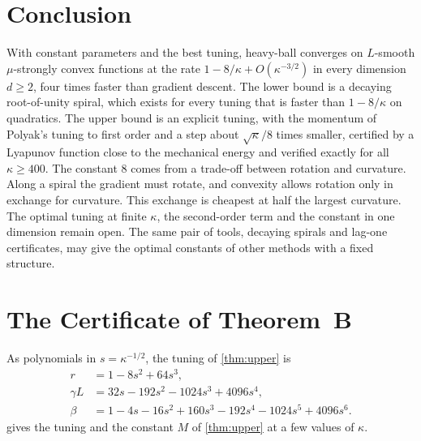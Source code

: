 \documentclass[11pt, a4paper]{article}
\theoremstyle{definition}
\begin{document}
\section{Conclusion}
\label{sec:conclusion}

With constant parameters and the best tuning, heavy-ball converges on $L$-smooth $\mu$-strongly convex functions at the
rate $1-8/\kappa+O(\kappa^{-3/2})$ in every dimension $d\ge2$, four times faster than gradient descent. The lower bound
is a decaying root-of-unity spiral, which exists for every tuning that is faster than $1-8/\kappa$ on quadratics. The
upper bound is an explicit tuning, with the momentum of Polyak's tuning to first order and a step about
$\sqrt\kappa/8$ times smaller, certified by a
Lyapunov function close to the mechanical energy and verified exactly for all $\kappa\ge400$. The constant $8$ comes
from a trade-off between rotation and curvature. Along a spiral the gradient must rotate, and convexity allows rotation
only in exchange for curvature. This exchange is cheapest at half the largest curvature. The optimal tuning at finite $\kappa$, the
second-order term and the constant in one dimension remain open. The same pair of tools, decaying spirals and lag-one
certificates, may give the optimal constants of other methods with a fixed structure.

\renewcommand{\bibsection}{\section*{\refname}\phantomsection\addcontentsline{toc}{section}{\refname}\markboth{\refname}{}}


\appendix
{}  %

\section{The Certificate of Theorem~B}
\label{app:P}

As polynomials in $s=\kappa^{-1/2}$, the tuning of \cref{thm:upper} is
\begin{align*}
  r&=1-8s^2+64s^3,\\
  \gamma L&=32s-192s^2-1024s^3+4096s^4,\\
  \beta&=1-4s-16s^2+160s^3-192s^4-1024s^5+4096s^6.
\end{align*}
 gives the tuning and the constant $M$ of \cref{thm:upper} at a few values of $\kappa$.
\end{document}
